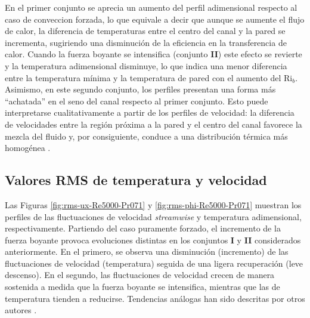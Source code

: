 

En el primer conjunto se aprecia un aumento del perfil adimensional respecto al caso de conveccion forzada, lo que equivale a decir que aunque se aumente el flujo de calor, la diferencia de temperaturas entre el centro del canal y la pared se incrementa, sugiriendo una disminución de la eficiencia en la transferencia de calor. Cuando la fuerza boyante se intensifica (conjunto \textbf{II}) este efecto se revierte y la temperatura adimensional disminuye, lo que indica una menor diferencia entre la temperatura mínima y la temperatura de pared con el aumento del Ri$_b$. Asimismo, en este segundo conjunto, los perfiles presentan una forma más ``achatada'' en el seno del canal respecto al primer conjunto. Esto puede interpretarse cualitativamente a partir de los perfiles de velocidad: la diferencia de velocidades entre la región próxima a la pared y el centro del canal favorece la mezcla del fluido y, por consiguiente, conduce a una distribución térmica más homogénea \cite{pope2001turbulent}.





\newpage
\subsection{Valores RMS de temperatura y velocidad} 

Las Figuras \ref{fig:rms-ux-Re5000-Pr071} y \ref{fig:rms-phi-Re5000-Pr071} muestran los perfiles de las fluctuaciones de velocidad \textit{streamwise} y temperatura adimensional, respectivamente. Partiendo del caso puramente forzado, el incremento de la fuerza boyante provoca evoluciones distintas en los conjuntos \textbf{I} y \textbf{II} considerados anteriormente. En el primero, se observa una disminución (incremento) de las fluctuaciones de velocidad (temperatura) seguida de una ligera recuperación (leve descenso). En el segundo, las fluctuaciones de velocidad crecen de manera sostenida a medida que la fuerza boyante se intensifica, mientras que las de temperatura tienden a reducirse. Tendencias análogas han sido descritas por otros autores \cite{you2003direct,carr1973velocity}.


